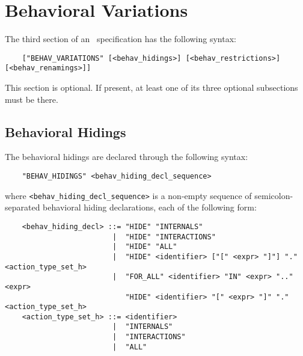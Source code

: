 \section{Behavioral Variations}

The third section of an \aemilia\ specification has the following syntax:

	\begin{verbatim}
    ["BEHAV_VARIATIONS" [<behav_hidings>] [<behav_restrictions>] [<behav_renamings>]]
	\end{verbatim}

\noindent This section is optional. If present, at least one of its three optional subsections must be
there.


\subsection{Behavioral Hidings}

The behavioral hidings are declared through the following syntax:

	\begin{verbatim}
    "BEHAV_HIDINGS" <behav_hiding_decl_sequence>
	\end{verbatim}

\noindent where {\tt <behav\_hiding\_decl\_sequence>} is a non-empty sequence of semicolon-separated
behavioral hiding declarations, each of the following form:

	\begin{verbatim}
    <behav_hiding_decl> ::= "HIDE" "INTERNALS"
                         |  "HIDE" "INTERACTIONS"
                         |  "HIDE" "ALL"
                         |  "HIDE" <identifier> ["[" <expr> "]"] "." <action_type_set_h>
                         |  "FOR_ALL" <identifier> "IN" <expr> ".." <expr>
                            "HIDE" <identifier> "[" <expr> "]" "." <action_type_set_h>
    <action_type_set_h> ::= <identifier>
                         |  "INTERNALS"
                         |  "INTERACTIONS"
                         |  "ALL"
	\end{verbatim}

